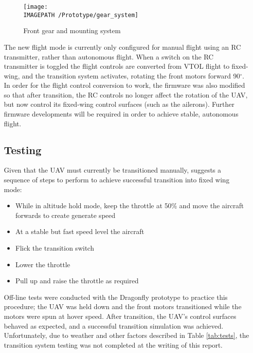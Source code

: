 \begin{figure}[!ht]
	\centering
	\texttt{[image: \\IMAGEPATH /Prototype/gear\_system]}
	\caption{Front gear and mounting system}
	\label{fig:gearsys}
\end{figure}

The new flight mode is currently only configured for manual flight using an RC transmitter, rather than autonomous flight. When a switch on the RC transmitter is toggled the flight controls are converted from VTOL flight to fixed-wing, and the transition system activates, rotating the front motors forward 90$^\circ$. In order for the flight control conversion to work, the firmware was also modified so that after transition, the RC controls no longer affect the rotation of the UAV, but now control its fixed-wing control surfaces (such as the ailerons). Further firmware developments will be required in order to achieve stable, autonomous flight.\\

\subsection{Testing}
Given that the UAV must currently be transitioned manually, \cite{ref:fireflyinstruction} suggests a sequence of steps to perform to achieve successful transition into fixed wing mode: 
\begin{itemize}
\item While in altitude hold mode, keep the throttle at 50\% and move the aircraft forwards to create generate speed
\item At a stable but fast speed level the aircraft
\item Flick the transition switch 
\item Lower the throttle
\item Pull up and raise the throttle as required		
\end{itemize}

Off-line tests were conducted with the Dragonfly prototype to practice this procedure; the UAV was held down and the front motors transitioned while the motors were spun at hover speed. After transition, the UAV's control surfaces behaved as expected, and a successful transition simulation was achieved. Unfortunately, due to weather and other factors described in Table \ref{tab:tests}, the transition system testing was not completed at the writing of this report.
